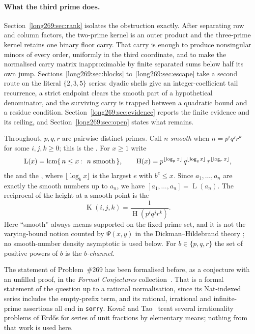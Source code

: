 \documentclass[11pt]{article}
\newcommand{\hgt}{\operatorname{H}}
\newcommand{\Lprefix}{\operatorname{L}}
\newcommand{\Kernel}{\operatorname{K}}
\begin{document}
\paragraph{What the third prime does.}
Section~\ref{long269:sec:rank} isolates the obstruction exactly.  After separating row
and column factors, the two-prime kernel is an outer product and the
three-prime kernel retains one binary floor carry.  That carry is enough to
produce nonsingular minors of every order, uniformly in the third coordinate,
and to make the normalised carry matrix inapproximable by finite separated sums
below half its own jump.  Sections~\ref{long269:sec:blocks} to~\ref{long269:sec:escape} take a
second route on the literal $\{2,3,5\}$ series: dyadic shells give an
integer-coefficient tail recurrence, a strict endpoint clears the smooth part
of a hypothetical denominator, and the surviving carry is trapped between a
quadratic bound and a residue condition.  Section~\ref{long269:sec:evidence} reports
the finite evidence and its ceiling, and Section~\ref{long269:sec:open} states what
remains.

Throughout, $p,q,r$ are pairwise distinct primes.  Call $n$ \emph{smooth} when
$n=p^{i}q^{j}r^{k}$ for some $i,j,k\ge0$; this is the
.  For $x\ge1$ write
\[
 \Lprefix(x)=\lcm\{\,n\le x:\ n\ \text{smooth}\,\},
 \qquad
 \hgt(x)=p^{\lfloor\log_p x\rfloor}\,q^{\lfloor\log_q x\rfloor}\,
 r^{\lfloor\log_r x\rfloor},
\]
the
 and the
, where $\lfloor\log_b x\rfloor$ is the largest $e$ with $b^{e}\le x$.
Since $a_1,\ldots,a_n$ are exactly the smooth numbers up to $a_n$, we have
$[a_1,\ldots,a_n]=\Lprefix(a_n)$.  The reciprocal of the height at a smooth
point is the
\[
 \Kernel(i,j,k)=\frac{1}{\hgt(p^{i}q^{j}r^{k})} .
\]
Here ``smooth'' always means supported on the fixed prime set, and it is not
the varying-bound notion counted by $\Psi(x,y)$ in the Dickman--Hildebrand
theory \cite[Theorem~1]{hildebrand1986}; no smooth-number density asymptotic is
used below.  For $b\in\{p,q,r\}$ the set of positive powers of $b$ is the
\emph{$b$-channel}.

The statement of Problem~\#269 has been formalised before, as a conjecture with
an unfilled proof, in the \emph{Formal Conjectures}
collection~\cite{formalconjectures269}.  That is a formal statement of the
question up to a rational normalisation, since its Nat-indexed series includes
the empty-prefix term, and its rational, irrational and infinite-prime
assertions all end in \texttt{sorry}.  Kova\v{c} and Tao~\cite{kovactao2024}
treat several irrationality problems of Erd\H{o}s for series of unit fractions
by elementary means; nothing from that work is used here.
\end{document}
